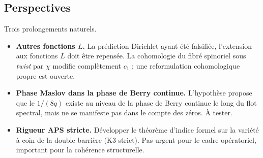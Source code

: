 \subsection{Perspectives}
\label{sec:perspectives}

Trois prolongements naturels.

\begin{itemize}[nosep,leftmargin=*]
\item \textbf{Autres fonctions $L$.} La prédiction Dirichlet ayant été
falsifiée, l'extension aux fonctions $L$ doit être repensée. La
cohomologie du fibré spinoriel sous \emph{twist} par $\chi$ modifie
complètement $c_1$ ; une reformulation cohomologique propre est
ouverte.
\item \textbf{Phase Maslov dans la phase de Berry continue.}
L'hypothèse propose que le $1/(8q)$ existe au niveau de la phase de
Berry continue le long du flot spectral, mais ne se manifeste pas dans
le compte des zéros. À tester.
\item \textbf{Rigueur APS stricte.} Développer le théorème d'indice
formel sur la variété à coin de la double barrière (K3 strict). Pas
urgent pour le cadre opératoriel, important pour la cohérence
structurelle.
\end{itemize}

